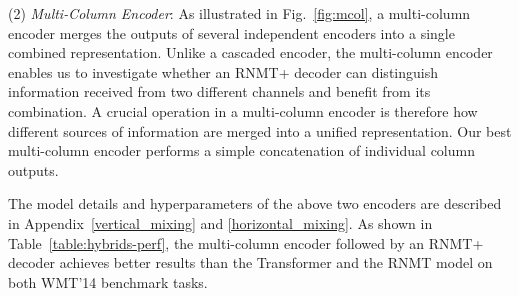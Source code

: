 \documentclass[11pt,a4paper]{article}
\begin{document}
(2) \textit{Multi-Column Encoder}:
As illustrated in Fig.~\ref{fig:mcol}, a multi-column encoder merges
the outputs of several independent encoders into a single
combined representation.
Unlike a cascaded encoder, the multi-column encoder enables us to investigate
whether an RNMT+ decoder can distinguish information received
from two different channels and benefit from its combination.
A crucial operation in a multi-column encoder is therefore how
different sources of information are merged into
a unified representation. Our best multi-column encoder performs a simple
concatenation of individual column outputs.



The model details and hyperparameters
of the above two encoders are described in
Appendix~\ref{vertical_mixing} and \ref{horizontal_mixing}. As shown
in Table~\ref{table:hybrids-perf}, the multi-column encoder followed
by an RNMT+ decoder achieves better results than the
Transformer and the RNMT model on both WMT'14 benchmark tasks.
\end{document}
